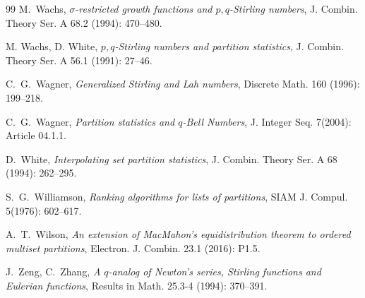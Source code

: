 \documentclass[12pt]{amsart}
\numberwithin{equation}{section}
\theoremstyle{plain}
\theoremstyle{definition}
\begin{document}
\begin{thebibliography}{99}
M.~Wachs, \emph{$\sigma$-restricted growth functions and $p,q$-Stirling numbers}, J. Combin. Theory Ser. A 68.2 (1994): 470--480.

M. Wachs, D. White, \emph{$p,q$-Stirling numbers and partition statistics}, J. Combin. Theory Ser. A 56.1 (1991): 27--46.

 C.~G.~Wagner, \emph{Generalized Stirling and Lah numbers}, Discrete Math. 160 (1996): 199--218.

C.~G.~Wagner, \emph{Partition statistics and $q$-Bell Numbers},
J. Integer Seq. 7(2004): Article 04.1.1.


D.~White, \emph{Interpolating set partition statistics}, J. Combin. Theory Ser. A 68 (1994): 262--295.

S.~G.~Williamson, \emph{Ranking algorithms for lists of partitions}, SIAM J. Compul. 5(1976): 602--617.

A.~T.~Wilson, \emph{An extension of MacMahon's equidistribution theorem to ordered multiset partitions}, Electron. J. Combin. 23.1 (2016): P1.5.

J.~Zeng, C.~Zhang, \emph{A $q$-analog of Newton's series, Stirling functions and Eulerian functions}, Results in Math. 25.3-4 (1994): 370--391.

\end{thebibliography}
\end{document}
